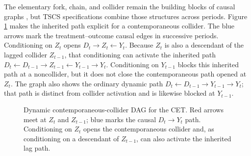 \documentclass[
]{article}
\begin{document}
The elementary fork, chain, and collider remain the building blocks of
causal graphs \citep{pearl2009causality, elwert2014endogenous}, but TSCS
specifications combine those structures across periods. Figure
\ref{fig:dynamic_collider_pa} makes the inherited path explicit for a
contemporaneous collider. The blue arrows mark the treatment--outcome
causal edges in successive periods. Conditioning on \(Z_t\) opens
\(D_t\rightarrow Z_t\leftarrow Y_t\). Because \(Z_t\) is also a
descendant of the lagged collider \(Z_{t-1}\), that conditioning can
activate the inherited path
\(D_t\leftarrow D_{t-1}\rightarrow Z_{t-1}\leftarrow Y_{t-1}\rightarrow Y_t\).
Conditioning on \(Y_{t-1}\) blocks this inherited path at a noncollider,
but it does not close the contemporaneous path opened at \(Z_t\). The
graph also shows the ordinary dynamic path
\(D_t\leftarrow D_{t-1}\rightarrow Y_{t-1}\rightarrow Y_t\); that path
is distinct from collider activation and is likewise blocked at
\(Y_{t-1}\).

\begin{figure}[H]
\centering
{}
\caption{Dynamic contemporaneous-collider DAG for the CET. Red arrows meet at $Z_t$ and $Z_{t-1}$; blue marks the causal $D_t\rightarrow Y_t$ path. Conditioning on $Z_t$ opens the contemporaneous collider and, as conditioning on a descendant of $Z_{t-1}$, can also activate the inherited lag path.}
\label{fig:three_structures_pa}
\label{fig:dynamic_collider_pa}
\end{figure}
\end{document}
